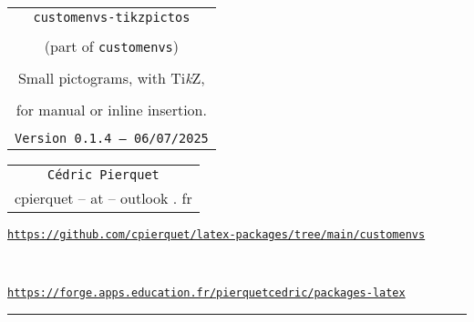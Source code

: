 \documentclass[english,10pt,a4paper]{article}
\def\TPversion{0.1.4}
\def\TPdate{06/07/2025}
\begin{document}
\pagestyle{fancy}

\thispagestyle{empty}

\begin{center}
	\begin{minipage}{0.88\linewidth}
	\begin{tcolorbox}[colframe=yellow,colback=yellow!15]
		\begin{center}
			\begin{tabular}{c}
				{\Huge \texttt{customenvs-tikzpictos}} \\
				\\
				{\LARGE (part of \texttt{customenvs})}\\
				\\
				{\LARGE Small pictograms, with Ti\textit{k}Z,} \\
				\\
				{\LARGE for manual or inline insertion.} \\
				\\
				{\small \texttt{Version \TPversion{} -- \TPdate}}
		\end{tabular}
		\end{center}
	\end{tcolorbox}
\end{minipage}
\end{center}

\begin{center}
	\begin{tabular}{c}
		\texttt{Cédric Pierquet}\\
		{\ttfamily cpierquet -- at -- outlook . fr}
	\end{tabular}
\end{center}

\begin{center}
\begin{minipage}{0.85\linewidth}
	\begin{tcolorbox}[colframe=teal,colback=teal!10,halign=center,fontupper=\footnotesize]
		\texttt{\url{https://github.com/cpierquet/latex-packages/tree/main/customenvs}}
		
		~
		
		\texttt{\url{https://forge.apps.education.fr/pierquetcedric/packages-latex}}
	\end{tcolorbox}
\end{minipage}
\end{center}

\vspace*{0.75cm}

\hrule
\end{document}
